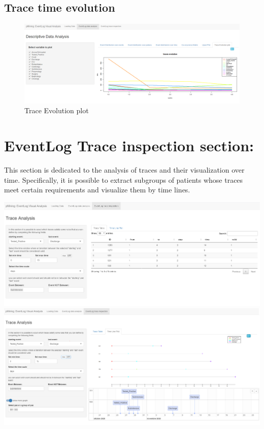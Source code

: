 \documentclass[
]{book}
\begin{document}
\hypertarget{trace-time-evolution}{%
\subsection{Trace time evolution}\label{trace-time-evolution}}

\begin{figure}
\centering
\includegraphics[width=1\textwidth,height=\textheight]{images/traceEvolution_plot.png}
\caption{Trace Evolution plot}
\end{figure}

\hypertarget{eventlog-trace-inspection-section}{%
\section{EventLog Trace inspection section:}\label{eventlog-trace-inspection-section}}

This section is dedicated to the analysis of traces and their visualization over time. Specifically, it is possible to extract subgroups of patients whose traces meet certain requirements and visualize them by time lines.

\includegraphics[width=1\textwidth,height=\textheight]{images/traceInspection.png}
\includegraphics[width=1\textwidth,height=\textheight]{images/trace_analysis2.png}
\end{document}
